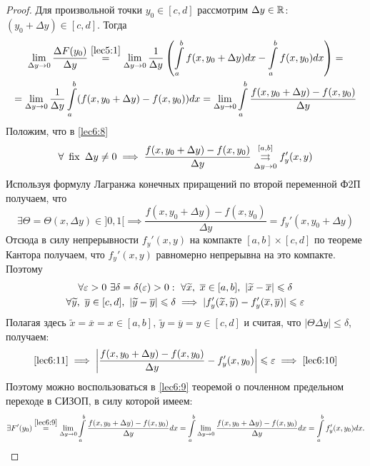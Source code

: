 \documentclass[../../main.tex]{subfiles}
\begin{document}
\begin{proof}
	Для произвольной точки $ y_0 \in [c, d] $ рассмотрим $ \Delta y \in \mathbb{R} $:
	$ (y_0 + \Delta y) \in [c, d] $. Тогда 
	\begin{equation}
	\begin{gathered}
		\lim\limits_{\Delta y \to 0} \dfrac{\Delta F(y_0)}{\Delta y} 
		\stackrel{\eqref{lec5:1}}{=} \lim\limits_{\Delta y \to 0}
		\dfrac{1}{\Delta y} \left(
		\int\limits_a^b f(x, y_0 + \Delta y) dx - \int\limits_a^b f(x, y_0) dx
		\right) = \\
		\label{lec6:9} =
		\lim\limits_{\Delta y \to 0} \dfrac{1}{\Delta y}
		\int\limits_a^b (f(x, y_0 + \Delta y) - f(x, y_0)) dx = 
		\lim\limits_{\Delta y \to 0}\int\limits_a^b
		\dfrac{f(x, y_0 + \Delta y) - f(x, y_0)}{\Delta y}
	\end{gathered}
	\end{equation}
	Положим, что в \eqref{lec6:8} 
	\begin{equation}
	\label{lec6:10} 
	\forall\ \operatorname{fix} \ \Delta y \neq 0 \implies
	\dfrac{f(x, y_0 + \Delta y) - f(x, y_0)}{\Delta y} 
	\stackrel{[a, b]}{\underset{\Delta y \to 0}{\rightrightarrows}} f_y'(x, y)
	\end{equation}
	Используя формулу Лагранжа конечных приращений по второй переменной 
	Ф2П получаем, что 
	\[ 
	\exists \Theta = \Theta(x, \Delta y) \in ]0, 1[ 
	\implies \dfrac{f(x, y_0 + \Delta y) - f(x, y_0)}{\Delta y} = 
	f_y'(x, y_0 + \Delta y)
	\]
	Отсюда в силу непрерывности $ f_y'(x, y) $ на компакте $ [a, b] \times 
	[c, d] $ по теореме Кантора получаем, что $ f_y'(x, y) $ равномерно
	непрерывна на это компакте. Поэтому
	\begin{equation}
		\begin{gathered}
		\forall \eps > 0 \ \exists \delta = \delta(\eps) > 0: \ 
		\forall \widetilde{x},\ \overline{x} \in [a, b],\ 
		|\widetilde{x} - \overline{x}| \leq \delta \\
		\label{lec6:11}
		\forall \widetilde{y},\ \overline{y} \in [c, d],\
		|\widetilde{y} - \overline{y}| \leq \delta \implies
		|f_y'(\widetilde{x}, \widetilde{y}) - f_y'(\overline{x}, \overline{y})|
		\leq \eps
		\end{gathered}
	\end{equation}
	Полагая здесь $ \widetilde{x} = \overline{x} = x \in [a, b],\ 
	\widetilde{y} = \overline{y} = y \in [c, d]	$ и считая, что 
	$ |\Theta\Delta y| \leq \delta $, получаем:
	\[
	\eqref{lec6:11} \implies\left|
	\dfrac{f(x, y_0 + \Delta y) - f(x, y_0)}{\Delta y} - f_y'(x, y_0)
	\right| \leqslant \varepsilon \implies \eqref{lec6:10}
	\]
	Поэтому можно воспользоваться в \eqref{lec6:9} теоремой о почленном 
	предельном переходе в СИЗОП, в силу которой имеем:
	\[
	\exists F'(y_0) \stackrel{\eqref{lec6:9}}{=} \lim\limits_{\Delta y \to 0}
	\int\limits_a^b \dfrac{f(x, y_0 + \Delta y) - f(x, y_0)}{\Delta y} dx =
	\int\limits_a^b \lim\limits_{\Delta y \to 0} 
	\dfrac{f(x, y_0 + \Delta y) - f(x, y_0)}{\Delta y} dx = 
	\int\limits_a^b f_y'(x, y_0) dx.
	\]
\end{proof}
\end{document}
